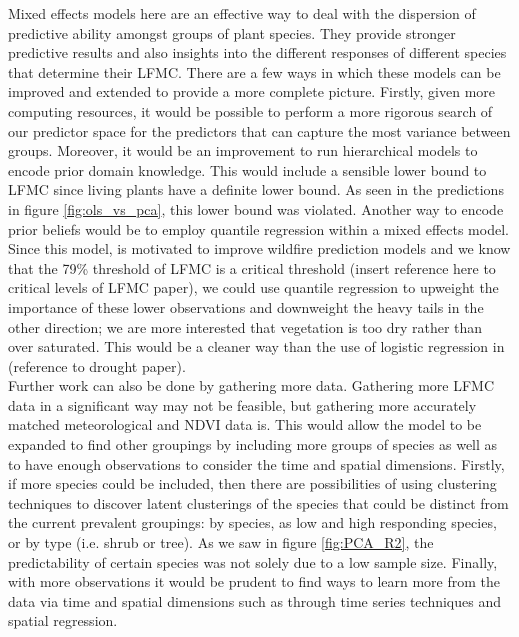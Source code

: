 \documentclass[twocolumn,10pt]{article}
\begin{document}
Mixed effects models here are an effective way to deal with the dispersion of predictive ability amongst groups of plant species. They provide stronger predictive results and also insights into the different responses of different species that determine their LFMC. There are a few ways in which these models can be improved and extended to provide a more complete picture. Firstly, given more computing resources, it would be possible to perform a more rigorous search of our predictor space for the predictors that can capture the most variance between groups. Moreover, it would be an improvement to run hierarchical models to encode prior domain knowledge. This would include a sensible lower bound to LFMC since living plants have a definite lower bound. As seen in the predictions in figure \ref{fig:ols_vs_pca}, this lower bound was violated. Another way to encode prior beliefs would be to employ quantile regression within a mixed effects model. Since this model, is motivated to improve wildfire prediction models and we know that the 79\% threshold of LFMC is a critical threshold (insert reference here to critical levels of LFMC paper), we could use quantile regression to upweight the importance of these lower observations and downweight the heavy tails in the other direction; we are more interested that vegetation is too dry rather than over saturated. This would be a cleaner way than the use of logistic regression in (reference to drought paper).\\

Further work can also be done by gathering more data. Gathering more LFMC data in a significant way may not be feasible, but gathering more accurately matched meteorological and NDVI data is. This would allow the model to be expanded to find other groupings by including more groups of species as well as to have enough observations to consider the time and spatial dimensions. Firstly, if more species could be included, then there are possibilities of using clustering techniques to discover latent clusterings of the species that could be distinct from the current prevalent groupings: by species, as low and high responding species, or by type (i.e. shrub or tree). As we saw in figure \ref{fig:PCA_R2}, the predictability of certain species was not solely due to a low sample size. Finally, with more observations it would be prudent to find ways to learn more from the data via time and spatial dimensions such as through time series techniques and spatial regression. \\
\end{document}
